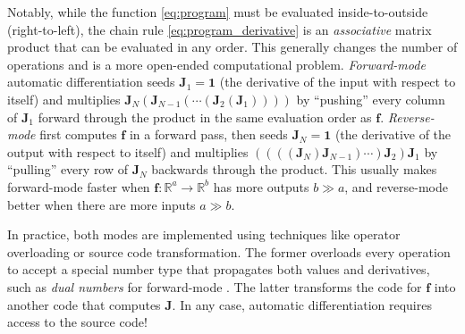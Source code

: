 \documentclass{aa}
\begin{document}
Notably, while the function \eqref{eq:program} must be evaluated inside-to-outside (right-to-left),
the chain rule \eqref{eq:program_derivative} is an \emph{associative} matrix product that can be evaluated in any order.
This generally changes the number of operations and is a more open-ended computational problem.
\textit{Forward-mode} automatic differentiation seeds $\boldsymbol{J}_1 = \boldsymbol{1}$ (the derivative of the input with respect to itself) and multiplies $\boldsymbol{J}_N (\boldsymbol{J}_{N-1} (\cdots (\boldsymbol{J}_2 (\boldsymbol{J}_1))))$ by \enquote{pushing} every column of $\boldsymbol{J}_1$ forward through the product in the same evaluation order as $\boldsymbol{f}$.
\textit{Reverse-mode} first computes $\boldsymbol{f}$ in a forward pass, then seeds $\boldsymbol{J}_N = \boldsymbol{1}$ (the derivative of the output with respect to itself) and multiplies $((((\boldsymbol{J}_N) \boldsymbol{J}_{N-1}) \cdots) \boldsymbol{J}_2) \boldsymbol{J}_1$ by \enquote{pulling} every row of $\boldsymbol{J}_N$ backwards through the product.
This usually makes forward-mode faster when $\boldsymbol{f}: \mathbb{R}^a \rightarrow \mathbb{R}^b$ has more outputs $b \gg a$, and reverse-mode better when there are more inputs $a \gg b$.

In practice, both modes are implemented using techniques like operator overloading or source code transformation.
The former overloads every operation to accept a special number type that propagates both values and derivatives, such as \textit{dual numbers} for forward-mode \cite[e.g.][]{revelsForwardModeAutomaticDifferentiation2016}.
The latter transforms the code for $\boldsymbol{f}$ into another code that computes $\boldsymbol{J}$.
In any case, automatic differentiation requires access to the source code!
\end{document}
